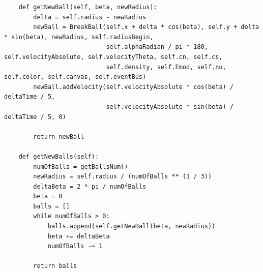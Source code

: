 \documentclass[utf8x, 14pt, oneside, a4paper]{article}
\begin{document}
\begin{lstlisting}
    def getNewBall(self, beta, newRadius):
        delta = self.radius - newRadius
        newBall = BreakBall(self.x + delta * cos(beta), self.y + delta * sin(beta), newRadius, self.radiusBegin,
                            self.alphaRadian / pi * 180, self.velocityAbsolute, self.velocityTheta, self.cn, self.cs,
                            self.density, self.Emod, self.nu, self.color, self.canvas, self.eventBus)
        newBall.addVelocity(self.velocityAbsolute * cos(beta) / deltaTime / 5,
                            self.velocityAbsolute * sin(beta) / deltaTime / 5, 0)

        return newBall

    def getNewBalls(self):
        numOfBalls = getBallsNum()
        newRadius = self.radius / (numOfBalls ** (1 / 3))
        deltaBeta = 2 * pi / numOfBalls
        beta = 0
        balls = []
        while numOfBalls > 0:
            balls.append(self.getNewBall(beta, newRadius))
            beta += deltaBeta
            numOfBalls -= 1

        return balls
\end{lstlisting}
\pagebreak
\end{document}
